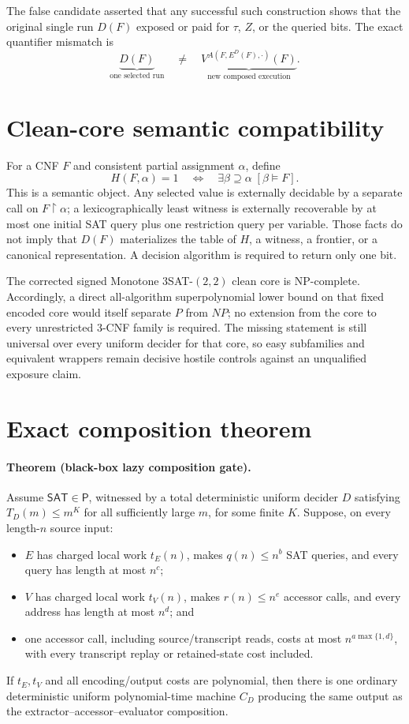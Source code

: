 \documentclass[11pt]{article}
\newcommand{\SAT}{\mathsf{SAT}}
\newcommand{\Pclass}{\mathsf{P}}
\begin{document}
The false candidate asserted that any successful such construction shows that
the original single run \(D(F)\) exposed or paid for \(\tau\), \(Z\), or the
queried bits.  The exact quantifier mismatch is
\[
 \underbrace{D(F)}_{\text{one selected run}}
 \quad\ne\quad
 \underbrace{V^{A(F,E^D(F),\cdot)}(F)}_{\text{new composed execution}}.
\]

\section{Clean-core semantic compatibility}
For a CNF \(F\) and consistent partial assignment \(\alpha\), define
\[
 H(F,\alpha)=1
 \quad\Longleftrightarrow\quad
 \exists\beta\supseteq\alpha\;[\beta\models F].
\]
This is a semantic object.  Any selected value is externally decidable by a
separate call on \(F\upharpoonright\alpha\); a lexicographically least
witness is externally recoverable by at most one initial SAT query plus one
restriction query per variable.  Those facts do not imply that \(D(F)\)
materializes the table of \(H\), a witness, a frontier, or a canonical
representation.  A decision algorithm is required to return only one bit.

The corrected signed Monotone \(3\)SAT-\((2,2)\) clean core is NP-complete.
Accordingly, a direct all-algorithm superpolynomial lower bound on that fixed
encoded core would itself separate \(P\) from \(NP\); no extension from the
core to every unrestricted 3-CNF family is required.  The missing statement
is still universal over every uniform decider for that core, so easy
subfamilies and equivalent wrappers remain decisive hostile controls against
an unqualified exposure claim.

\section{Exact composition theorem}
\paragraph{Theorem (black-box lazy composition gate).}
Assume \(\SAT\in\Pclass\), witnessed by a total deterministic uniform decider
\(D\) satisfying \(T_D(m)\le m^K\) for all sufficiently large \(m\), for
some finite \(K\).  Suppose, on every length-\(n\) source input:
\begin{itemize}[leftmargin=*]
\item \(E\) has charged local work \(t_E(n)\), makes
\(q(n)\le n^b\) SAT queries, and every query has length at most \(n^c\);
\item \(V\) has charged local work \(t_V(n)\), makes
\(r(n)\le n^e\) accessor calls, and every address has length at most
\(n^d\); and
\item one accessor call, including source/transcript reads, costs at most
\(n^{a\max\{1,d\}}\), with every transcript replay or retained-state cost
included.
\end{itemize}
If \(t_E,t_V\) and all encoding/output costs are polynomial, then there is
one ordinary deterministic uniform polynomial-time machine \(C_D\) producing
the same output as the extractor--accessor--evaluator composition.
\end{document}

